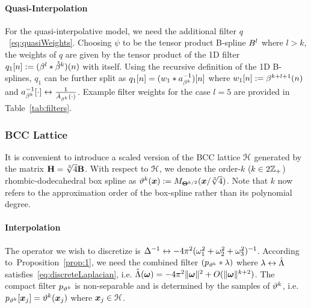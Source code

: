 \paragraph{Quasi-Interpolation}
For the quasi-interpolative model, we need the additional filter $q$~\eqref{eq:quasiWeights}. Choosing $\psi$ to be the tensor product B-spline $\tpbs^l$ where $l>k$, the weights of $q$ are given by the
tensor product of the 1D filter $q_1[n] := (\cbs^l \ast \dual{\cbs}^k)(n)$ with itself. 
Using the recursive definition of the 1D B-splines, $q_1$ can be further split as $q_1[n] = (w_1 \ast a_{\cbs^k}^{-1})[n]$ where $w_1[n] := \cbs^{k+l+1}(n)$ and $\ftpairs{a_{\cbs^k}^{-1}[\cdot]}{\tfrac{1}{\ft{A}_{\cbs^k}(\cdot)}}$. 
Example filter weights for the case $l=5$ are provided in Table~\ref{tab:filters}.

\subsubsection{BCC Lattice}
It is convenient to introduce a scaled version of the BCC lattice $\lattice{H}$ generated by the matrix $\mat{H} = \sqrt[3]{4}\mat{B}$. 
With respect to $\lattice{H}$, we denote the order-$k$ ($k \in 2\ints_+$) rhombic-dodecahedral box spline as $\bccbs{k}(\vect{x}) := \boxsp[k/2]{\mat{\Theta}}(\vect{x}/\sqrt[3]{4})$. 
Note that $k$ now refers to the approximation order of the box-spline rather than its polynomial degree.

\paragraph{Interpolation}
The operator we wish to discretize is $\ftpairs{\invlaplacian}{-4\pi^2(\omega_1^2 + \omega_2^2 + \omega_3^2)^{-1}}$. 
According to~Proposition~\ref{prop:1}, we need the combined filter $(p_{\bccbs{k}} \ast \lambda)$ where $\ftpairs{\lambda}{\ft{\Lambda}}$ satisfies~\eqref{eq:discreteLaplacian}, i.e. $\ft{\Lambda}(\vect{\omega}) = -4\pi^2\norm{\vect{\omega}}^2 + O(\norm{\vect{\omega}}^{k+2})$. 
The compact filter $p_{\bccbs{k}}$ is non-separable and is determined by the samples of $\bccbs{k}$, i.e. $p_{\bccbs{k}}[\vect{x}_j] = \bccbs{k}(\vect{x}_j)$ where $\vect{x}_j \in \lattice{H}$. 

